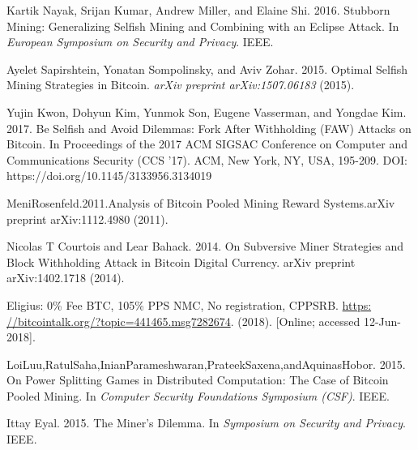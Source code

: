 \documentclass[a4paper, 11pt]{article}
\begin{document}
\begin{CJK*}{UTF8}{gbsn}
\begin{thebibliography}{8}
    Kartik Nayak, Srijan Kumar, Andrew Miller, and Elaine Shi. 2016. Stubborn
    Mining: Generalizing Selfish Mining and Combining with an Eclipse Attack. 
    In \textit{European Symposium on Security and Privacy}. IEEE.

    Ayelet Sapirshtein, Yonatan Sompolinsky, and Aviv Zohar. 2015. Optimal Selfish
    Mining Strategies in Bitcoin.
    \textit{arXiv preprint arXiv:1507.06183} (2015).

    Yujin Kwon, Dohyun Kim, Yunmok Son, Eugene Vasserman, and Yongdae Kim. 2017. 
    Be Selfish and Avoid Dilemmas: Fork After Withholding (FAW) Attacks on Bitcoin. 
    In Proceedings of the 2017 ACM SIGSAC Conference on Computer and Communications Security (CCS '17). 
    ACM, New York, NY, USA, 195-209. DOI: https://doi.org/10.1145/3133956.3134019

    MeniRosenfeld.2011.Analysis of Bitcoin Pooled Mining Reward Systems.arXiv
    preprint arXiv:1112.4980 (2011).

    Nicolas T Courtois and Lear Bahack. 2014. 
    On Subversive Miner Strategies and Block Withholding Attack in Bitcoin Digital Currency. 
    arXiv preprint arXiv:1402.1718 (2014).

    Eligius: 0\% Fee BTC, 105\% PPS NMC, No registration, CPPSRB.
    \url{https: //bitcointalk.org/?topic=441465.msg7282674}.
    (2018).
    [Online; accessed 12-Jun-2018].

    LoiLuu,RatulSaha,InianParameshwaran,PrateekSaxena,andAquinasHobor. 2015. 
    On Power Splitting Games in Distributed Computation: The Case of Bitcoin Pooled Mining. 
    In \textit{Computer Security Foundations Symposium (CSF)}. IEEE.

    Ittay Eyal. 2015. The Miner’s Dilemma. In \textit{Symposium on Security and Privacy}.
IEEE.

    \end{thebibliography}
    
    \end{CJK*}
    
    
\end{document}
